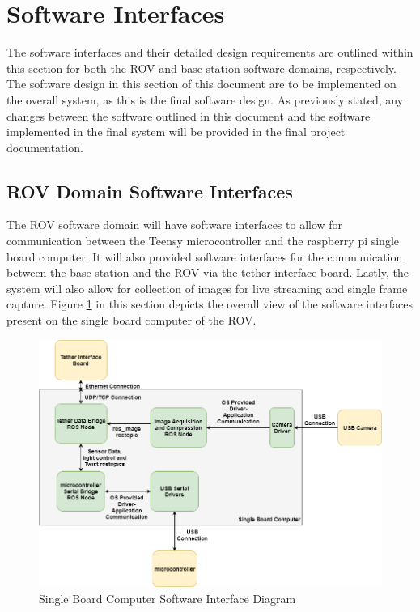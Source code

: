 \documentclass{scrreprt}
\begin{document}
\section{Software Interfaces}
The software interfaces and their detailed design requirements are outlined within this section for both the ROV and base station software domains, respectively. The software design in this section of this document are to be implemented on the overall system, as this is the final software design. As previously stated, any changes between the software outlined in this document and the software implemented in the final system will be provided in the final project documentation. 

\subsection{ROV Domain Software Interfaces}
The ROV software domain will have software interfaces to allow for communication between the Teensy microcontroller and the raspberry pi single board computer. It will also provided software interfaces for the communication between the base station and the ROV via the tether interface board. Lastly, the system will also allow for collection of images for live streaming and single frame capture. Figure \ref{fig:Single Board Computer Software Interface Diagram} in this section depicts the overall view of the software interfaces present on the single board computer of the ROV.

\begin{figure}[!ht]
    \centering
    \includegraphics[scale=0.45]{SingleBoardComputerSoftware.png}
    \caption{Single Board Computer Software Interface Diagram}
    \label{fig:Single Board Computer Software Interface Diagram}
\end{figure}
\FloatBarrier
\end{document}
